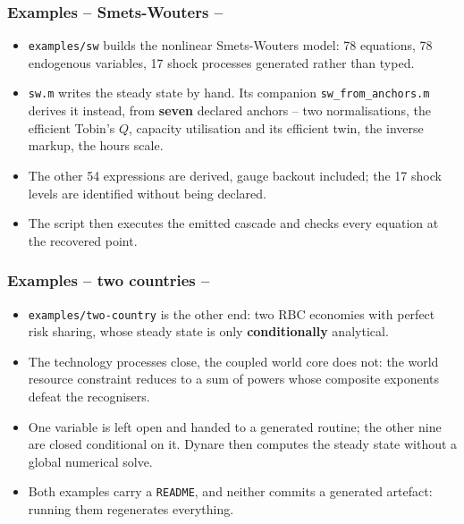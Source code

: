 \documentclass[10pt,slidestop]{beamer}
\theoremstyle{plain}
\begin{document}
\begin{frame}[c,fragile]
  \frametitle{Examples -- Smets-Wouters --}

  \begin{itemize}

  \item \verb+examples/sw+ builds the nonlinear Smets-Wouters model: 78
    equations, 78 endogenous variables, 17 shock processes generated rather than
    typed.\newline

  \item \verb+sw.m+ writes the steady state by hand. Its companion
    \verb+sw_from_anchors.m+ derives it instead, from \textbf{seven} declared
    anchors -- two normalisations, the efficient Tobin's $Q$, capacity
    utilisation and its efficient twin, the inverse markup, the hours
    scale.\newline

  \item The other 54 expressions are derived, gauge backout included; the 17
    shock levels are identified without being declared.\newline

  \item The script then executes the emitted cascade and checks every equation
    at the recovered point.

  \end{itemize}

\end{frame}


\begin{frame}[c,fragile]
  \frametitle{Examples -- two countries --}

  \begin{itemize}

  \item \verb+examples/two-country+ is the other end: two RBC economies with
    perfect risk sharing, whose steady state is only \textbf{conditionally}
    analytical.\newline

  \item The technology processes close, the coupled world core does not: the
    world resource constraint reduces to a sum of powers whose composite
    exponents defeat the recognisers.\newline

  \item One variable is left open and handed to a generated routine; the other
    nine are closed conditional on it. Dynare then computes the steady state
    without a global numerical solve.\newline

  \item Both examples carry a \verb+README+, and neither commits a generated
    artefact: running them regenerates everything.

  \end{itemize}

\end{frame}
\end{document}
